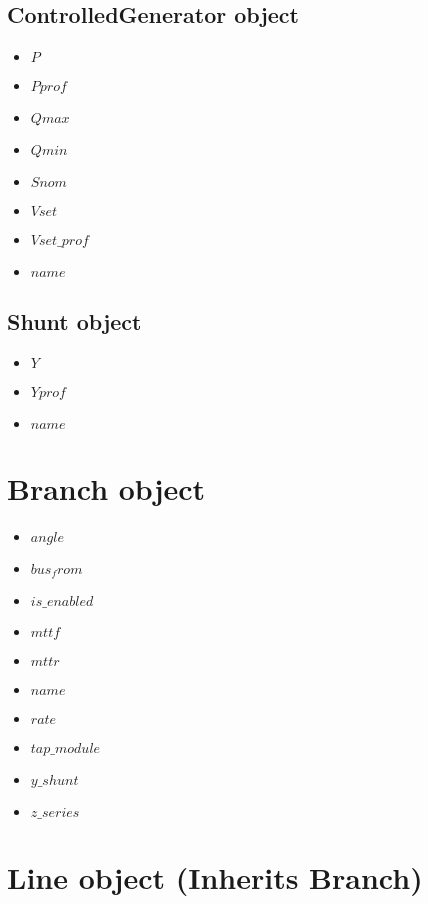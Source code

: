 \documentclass[11pt,fleqn]{book} %
\begin{document}
\subsection{ControlledGenerator object}

\begin{itemize}
	\item $P$
	\item $Pprof$
	\item $Qmax$
	\item $Qmin$
	\item $Snom$
	\item $Vset$
	\item $Vset\_prof$
	\item $name$
\end{itemize}



\subsection{Shunt object}

\begin{itemize}
	\item $Y$
	\item $Yprof$
	\item $name$
\end{itemize}



\section{Branch object}


\begin{itemize}
	\item $angle$
	\item $bus_from$
	\item $is\_enabled$
	\item $mttf$
	\item $mttr$
	\item $name$
	\item $rate$
	\item $tap\_module$
	\item $y\_shunt$
	\item $z\_series$
\end{itemize}



\section{Line object (Inherits Branch)}
\end{document}
